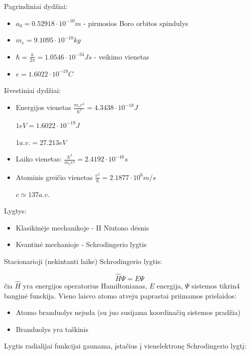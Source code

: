 Pagrindiniai dydžiai:
\begin{itemize}
    \item $a_0 = 0.52918 \cdot 10^{-10} m$ - pirmosios Boro orbitos spindulys
    \item $m_e=9.1095 \cdot 10^{-10} kg$
    \item $\hbar = \frac{h}{2 \pi} = 1.0546 \cdot 10^{-34} Js$ - veikimo vienetas
    \item $e=1.6022 \cdot 10^{-19} C$
\end{itemize}

Išvestiniai dydžiai:
\begin{itemize}
    \item Energijos vienetas 
    $\frac{m_e e^4}{\hbar^2} = 4.3438 \cdot 10^{-18} J$
    
    $1eV = 1.6022 \cdot 10^{-19}J$

    $1 a.v. = 27.213 eV$

    \item Laiko vienetas:
    $\frac{\hbar^3}{m_e e^4} = 2.4192 \cdot 10^{-16} s$

    \item Atominis greičio vienetas
    $\frac{e^2}{\hbar} = 2.1877 \cdot 10^6 m/s$

    $c \simeq 137 a.v.$
\end{itemize}


Lygtys:
\begin{itemize}
    \item Klasikinėje mechanikoje - II Niutono dėsnis
    \item Kvantinė mechanioje - Schrodingerio lygtis
\end{itemize}

Stacionarioji (nekintanti laike) Schrodingerio lygtis:

\begin{equation*}
    \hat{H} \Psi = E \Psi
\end{equation*}
čia $\hat{H}$ yra energijos operatorius Hamiltonianas, $E$ energija, $\Psi$ sistemos tikrin4 banginė funckija. Vieno laisvo atomo atveju paprastai priimamos prielaidos:
\begin{itemize}
    \item Atomo branduolys nejuda (su juo susijama koordinačių sistemos pradžia)
    \item Branduolys yra taškinis
\end{itemize}


Lygtis radialijai funkcijai gaunama, įstačius į vienelektronę Schrodingerio lygtį:

